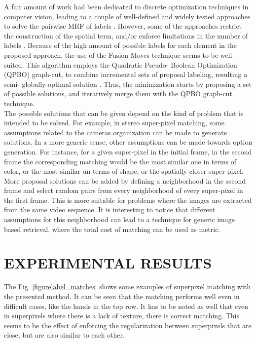 A fair amount of work had been dedicated to
discrete optimization techniques in computer vision,
leading to a couple of well-defined and widely tested
approaches to solve the pairwise MRF of labels \cite{c3}\cite{c4}.
However, some of the approaches restrict the
construction of the spatial term, and/or enforce
limitations in the number of labels \cite{c3}.
Because of the high amount of possible labels for 
each element in the proposed approach, the use of the
Fusion Moves \cite{c7} technique seems to be well suited.
This algorithm employs the Quadratic Pseudo-
Boolean Optimization (QPBO) graph-cut, to combine
incremental sets of proposal labeling, resulting a semi-
globally-optimal solution \cite{c4}.
Thus, the minimization starts by proposing a set of
possible solutions, and iteratively merge them with
the QPBO graph-cut technique. \\
The possible solutions that can be given depend on the kind of
problem that is intended to be solved. For example, in
stereo super-pixel matching, some assumptions
related to the cameras organization can be made to
generate solutions.
In a more generic sense, other assumptions can be
made towards option generation. For instance, for a
given super-pixel in the initial frame, in the second
frame the corresponding matching would be the most
similar one in terms of color, or the most similar un
terms of shape, or the spatially closer super-pixel.
More proposal solutions can be added by defining a
neighborhood in the second frame and select random
pairs from every neighborhood of every super-pixel
in the first frame. This is more suitable for problems
where the images are extracted from the same video
sequence. It is interesting to notice that different
assumptions for this neighborhood can lead to a
technique for generic image based retrieval, where
the total cost of matching can be used as metric.

\section{EXPERIMENTAL RESULTS}
The Fig. \ref{figurelabel_matches} shows some examples of superpixel
matching with the presented method. It can be seen
that the matching performs well even in difficult
cases, like the hands in the top row. It has to be noted
as well that even in superpixels where there is a lack
of texture, there is correct matching. This seems to be
the effect of enforcing the regularization between
superpixels that are close, but are also similar to
each other.

